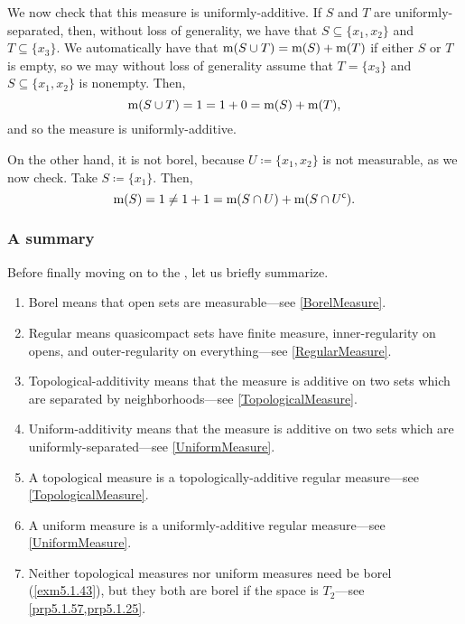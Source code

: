 \begin{exm}
We now check that this measure is uniformly-additive.  If $S$ and $T$ are uniformly-separated, then, without loss of generality, we have that $S\subseteq \{ x_1,x_2\}$ and $T\subseteq \{ x_3\}$.  We automatically have that $\mathrm{m} (S\cup T)=\mathrm{m} (S)+\mathrm{m} (T)$ if either $S$ or $T$ is empty, so we may without loss of generality assume that $T=\{ x_3\}$ and $S\subseteq \{ x_1,x_2\}$ is nonempty.  Then,
\begin{equation}
\mathrm{m} (S\cup T)=1=1+0=\mathrm{m} (S)+\mathrm{m} (T),
\end{equation}
and so the measure is uniformly-additive.

On the other hand, it is not borel, because $U\coloneqq \{ x_1,x_2\}$ is not measurable, as we now check.  Take $S\coloneqq \{ x_1\}$.  Then,
\begin{equation}
\mathrm{m} (S)=1\neq 1+1=\mathrm{m} (S\cap U)+\mathrm{m} (S\cap U^{\mathsf{c}}).
\end{equation}
\end{exm}

\subsubsection{A summary}

Before finally moving on to the , let us briefly summarize.
\begin{enumerate}
\item Borel means that open sets are measurable---see \cref{BorelMeasure}.
\item Regular means quasicompact sets have finite measure, inner-regularity on opens, and outer-regularity on everything---see \cref{RegularMeasure}.
\item Topological-additivity means that the measure is additive on two sets which are separated by neighborhoods---see \cref{TopologicalMeasure}.
\item Uniform-additivity means that the measure is additive on two sets which are uniformly-separated---see \cref{UniformMeasure}.
\item A topological measure is a topologically-additive regular measure---see \cref{TopologicalMeasure}.
\item A uniform measure is a uniformly-additive regular measure---see \cref{UniformMeasure}.
\item Neither topological measures nor uniform measures need be borel (\cref{exm5.1.43}), but they both are borel if the space is $T_2$---see \cref{prp5.1.57,prp5.1.25}.
\end{enumerate}

